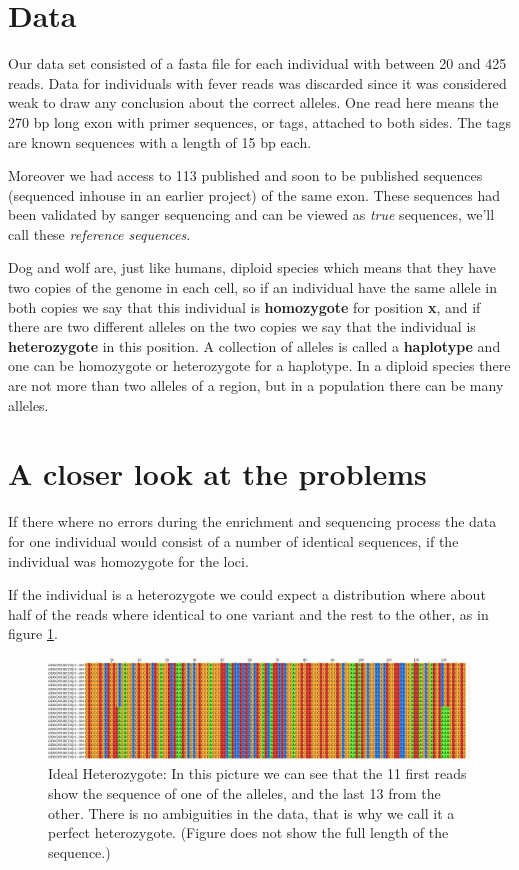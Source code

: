 \documentclass[a4paper,11pt]{kth-mag}
\begin{document}
\section{Data}

Our data set consisted of a fasta file for each individual with between 20 and 425 reads. Data for individuals with fever reads was discarded since it was considered weak to draw any conclusion about the correct alleles. One read here means the 270 bp long exon with primer sequences, or tags, attached to both sides. The tags are known sequences with a length of 15 bp each. 

Moreover we had access to 113 published and soon to be published sequences (sequenced inhouse in an earlier project) of the same exon. These sequences had been validated by sanger sequencing \cite{sanger} and can be viewed as \emph{true} sequences, we'll call these \emph{reference sequences}.

Dog and wolf are, just like humans, diploid species which means that they have two copies of the genome in each cell, so if an individual have the same allele in both copies we say that this individual is \textbf{homozygote} for position \textbf{x}, and if there are two different alleles on the two copies we say that the individual is \textbf{heterozygote} in this position. A collection of alleles is called a \textbf{haplotype} and one can be homozygote or heterozygote for a haplotype. In a diploid species there are not more than two alleles of a region, but in a population there can be many alleles.

\section{A closer look at the problems}

If there where no errors during the enrichment and sequencing process the data for one individual would consist of a number of identical sequences, if the individual was homozygote for the loci.

If the individual is a heterozygote we could expect a distribution where about half of the reads where identical to one variant and the rest to the other, as in figure \ref{fig:perfect_heterozygote}.

\begin{figure}[ht]
	\centering
		\includegraphics[width=\textwidth]{../pictures/../pictures/perfect_heterozygote.png}
	\caption{Ideal Heterozygote: In this picture we can see that the 11 first reads show the sequence of one of the alleles, and the last 13 from the other. There is no ambiguities in the data, that is why we call it a perfect heterozygote. (Figure does not show the full length of the sequence.)}
	\label{fig:perfect_heterozygote}
\end{figure}
\end{document}
